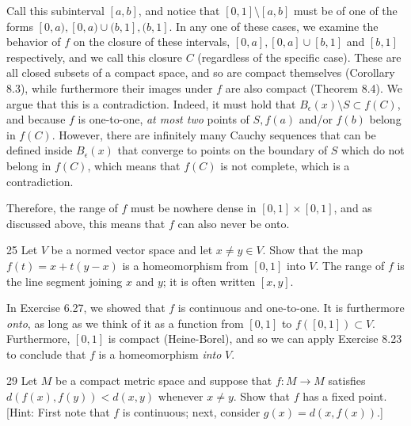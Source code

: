 \begin{solution}
    Call this subinterval $[a, b]$, and notice that $[0, 1] \setminus [a, b]$ must be of one of the forms $[0, a), [0, a) \cup (b, 1], (b, 1]$.
    In any one of these cases, we examine the behavior of $f$ on the closure of these intervals, $[0, a], [0, a] \cup [b, 1]$ and $[b, 1]$ respectively, and we call this closure $C$ (regardless of the specific case).
    These are all closed subsets of a compact space, and so are compact themselves (Corollary 8.3), while furthermore their images under $f$ are also compact (Theorem 8.4).
    We argue that this is a contradiction.
    Indeed, it must hold that $B_{\epsilon}(x) \setminus S \subset f(C)$, and because $f$ is one-to-one, \textit{at most two} points of $S, f(a)$ and/or $f(b)$ belong in $f(C)$.
    However, there are infinitely many Cauchy sequences that can be defined inside $B_{\epsilon}(x)$ that converge to points on the boundary of $S$ which do not belong in $f(C)$, which means that $f(C)$ is not complete, which is a contradiction.

    Therefore, the range of $f$ must be nowhere dense in $[0, 1] \times [0, 1]$, and as discussed above, this means that $f$ can also never be onto.

\end{solution}

\begin{exercise}{25}
    Let $V$ be a normed vector space and let $x \neq y \in V$.
    Show that the map $f(t) = x + t(y - x)$ is a homeomorphism from $[0, 1]$ into $V$.
    The range of $f$ is the line segment joining $x$ and $y$; it is often written $[x, y]$.
\end{exercise}

\begin{solution}
    
    In Exercise 6.27, we showed that $f$ is continuous and one-to-one.
    It is furthermore \textit{onto}, as long as we think of it as a function from $[0, 1]$ to $f([0, 1]) \subset V$.
    Furthermore, $[0, 1]$ is compact (Heine-Borel), and so we can apply Exercise 8.23 to conclude that $f$ is a homeomorphism \textit{into} $V$.
\end{solution}

\begin{exercise}{29}
    Let $M$ be a compact metric space and suppose that $f: M \rightarrow M$ satisfies $d(f(x), f(y)) < d(x, y)$ whenever $x \neq y$.
    Show that $f$ has a fixed point.
    [Hint: First note that $f$ is continuous; next, consider $g(x) = d(x, f(x))$.]
\end{exercise}

